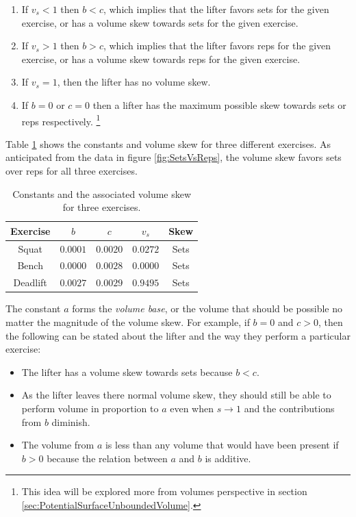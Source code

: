 \begin{enumerate}
    \item If $v_s<1$ then $b<c$, which implies that the lifter favors sets for the given exercise, or has a volume skew towards sets for the given exercise.
    \item If $v_s>1$ then $b>c$, which implies that the lifter favors reps for the given exercise, or has a volume skew towards reps for the given exercise.
    \item If $v_s=1$, then the lifter has no volume skew.
    \item If $b=0$ or $c=0$ then a lifter has the maximum possible skew towards sets or reps respectively. \footnote{This idea will be explored more from volumes perspective in section \ref{sec:PotentialSurfaceUnboundedVolume}.}
\end{enumerate}

Table \ref{tab:VolumeSkewAcrossExercises} shows the constants and volume skew for three different exercises. As anticipated from the data in figure \ref{fig:SetsVsReps}, the volume skew favors sets over reps for all three exercises.

\begin{table}[h]
    \centering
    \begin{tabular}{c|c|c|c|c}
        Exercise & $b$ & $c$ & $v_s$ & Skew \\
        \hline
        Squat & $0.0001$ & $0.0020$ & $0.0272$ & Sets \\
        Bench & $0.0000$ & $0.0028$ & $0.0000$ & Sets \\
        Deadlift & $0.0027$ & $0.0029$ & $0.9495$ & Sets \\
    \end{tabular}
    \caption{Constants and the associated volume skew for three exercises.}
    \label{tab:VolumeSkewAcrossExercises}
\end{table}

The constant $a$ forms the \textit{volume base}, or the volume that should be possible no matter the magnitude of the volume skew. For example, if $b=0$ and $c>0$, then the following can be stated about the lifter and the way they perform a particular exercise:

\begin{itemize}
    \item The lifter has a volume skew towards sets because $b<c$.
    \item As the lifter leaves there normal volume skew, they should still be able to perform volume in proportion to $a$ even when $s\to 1$ and the contributions from $b$ diminish.
    \item The volume from $a$ is less than any volume that would have been present if $b>0$ because the relation between $a$ and $b$ is additive.
\end{itemize}

